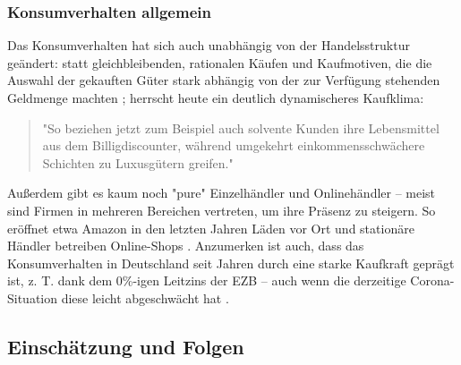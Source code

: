 \documentclass[a4paper, 12pt]{scrartcl}
\makeatletter
\newenvironment{folding}{\endgroup}{\begingroup \def \@currenvir{folding}\edef \@currenvline{\on@line}}
\makeatother
\begin{document}
\begin{folding} \subsubsection{Konsumverhalten allgemein}

Das Konsumverhalten hat sich auch unabhängig von der Handelsstruktur geändert: statt gleichbleibenden, rationalen Käufen und Kaufmotiven, die die Auswahl der gekauften Güter stark abhängig von der zur Verfügung stehenden Geldmenge machten \cite[S. 38]{Schramm}; herrscht heute ein deutlich dynamischeres Kaufklima:
\begin{quote}
"So beziehen jetzt zum Beispiel auch solvente Kunden ihre Lebensmittel aus dem Billigdiscounter, während  umgekehrt  einkommensschwächere  Schichten  zu  Luxusgütern  greifen." \cite[S. 43]{Nitt}
\end{quote}
Außerdem gibt es kaum noch "pure" Einzelhändler und Onlinehändler – meist sind Firmen in mehreren Bereichen vertreten, um ihre Präsenz zu steigern. So eröffnet etwa Amazon in den letzten Jahren Läden vor Ort und stationäre Händler betreiben Online-Shops \cite[S. 50]{Graf}.
Anzumerken ist auch, dass das Konsumverhalten in Deutschland seit Jahren durch eine starke Kaufkraft geprägt ist, z. T. dank dem 0\%-igen Leitzins der \ac{EZB} \cite[S. 49]{Ebert} – auch wenn die derzeitige Corona-Situation diese leicht abgeschwächt hat \cite{BfWE}. 

\end{folding}




            
        \subsection{Einschätzung und Folgen}
        
        
        
        
        
        
        


\end{document}
